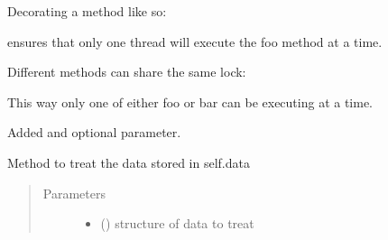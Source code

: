 \begin{fulllineitems}
\begin{fulllineitems}
Decorating a method like so:

\begin{sphinxVerbatim}[commandchars=\\\{\}]
  
\end{sphinxVerbatim}

ensures that only one thread will execute the foo method at a time.

Different methods can share the same lock:

\begin{sphinxVerbatim}[commandchars=\\\{\}]
  

  
\end{sphinxVerbatim}

This way only one of either foo or bar can be executing at a time.

Added  and  optional parameter.

\end{fulllineitems}


\begin{fulllineitems}
\label{\detokenize{eboa.engine:eboa.engine.engine.Engine.treat_data}}
Method to treat the data stored in self.data
\begin{quote}\begin{description}
\item[{Parameters}] \leavevmode\begin{itemize}
\item {} 
 () \textendash{} structure of data to treat


\end{itemize}
\end{description}
\end{quote}
\end{fulllineitems}
\end{fulllineitems}
